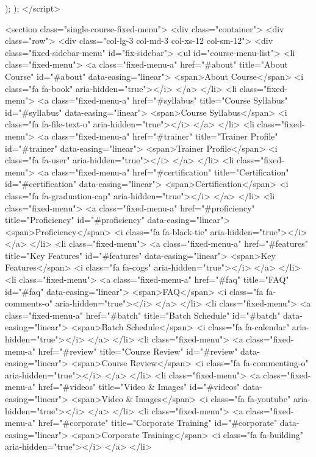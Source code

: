 {{{{      }
    });
  });
</script>

<section class="single-course-fixed-menu">
<div class="container">
<div class="row">
<div class="col-lg-3 col-md-3 col-xs-12 col-sm-12">
<div class="fixed-sidebar-menu" id="fix-sidebar">
<ul id="course-menu-list">
<li class="fixed-menu">
<a class="fixed-menu-a" href="#about" title="About Course" id="#about" data-easing="linear">
<span>About Course</span>
<i class="fa fa-book" aria-hidden="true"></i>
</a>
</li>
<li class="fixed-menu">
<a class="fixed-menu-a" href="#syllabus" title="Course Syllabus" id="#syllabus" data-easing="linear">
<span>Course Syllabus</span>
<i class="fa fa-file-text-o" aria-hidden="true"></i>
</a>
</li>
<li class="fixed-menu">
<a class="fixed-menu-a" href="#trainer" title="Trainer Profile" id="#trainer" data-easing="linear">
<span>Trainer Profile</span>
<i class="fa fa-user" aria-hidden="true"></i>
</a>
</li>
<li class="fixed-menu">
<a class="fixed-menu-a" href="#certification" title="Certification" id="#certification" data-easing="linear">
<span>Certification</span>
<i class="fa fa-graduation-cap" aria-hidden="true"></i>
</a>
</li>
<li class="fixed-menu">
<a class="fixed-menu-a" href="#proficiency" title="Proficiency" id="#proficiency" data-easing="linear">
<span>Proficiency</span>
<i class="fa fa-black-tie" aria-hidden="true"></i>
</a>
</li>
<li class="fixed-menu">
<a class="fixed-menu-a" href="#features" title="Key Features" id="#features" data-easing="linear">
<span>Key Features</span>
<i class="fa fa-cogs" aria-hidden="true"></i>
</a>
</li>
<li class="fixed-menu">
<a class="fixed-menu-a" href="#faq" title="FAQ" id="#faq" data-easing="linear">
<span>FAQ</span>
<i class="fa fa-comments-o" aria-hidden="true"></i>
</a>
</li>
<li class="fixed-menu">
<a class="fixed-menu-a" href="#batch" title="Batch Schedule" id="#batch" data-easing="linear">
<span>Batch Schedule</span>
<i class="fa fa-calendar" aria-hidden="true"></i>
</a>
</li>
<li class="fixed-menu">
<a class="fixed-menu-a" href="#review" title="Course Review" id="#review" data-easing="linear">
<span>Course Review</span>
<i class="fa fa-commenting-o" aria-hidden="true"></i>
</a>
</li>
<li class="fixed-menu">
<a class="fixed-menu-a" href="#videos" title="Video & Images" id="#videos" data-easing="linear">
<span>Video & Images</span>
<i class="fa fa-youtube" aria-hidden="true"></i>
</a>
</li>
<li class="fixed-menu">
<a class="fixed-menu-a" href="#corporate" title="Corporate Training" id="#corporate" data-easing="linear">
<span>Corporate Training</span>
<i class="fa fa-building" aria-hidden="true"></i>
</a>
</li>
}
